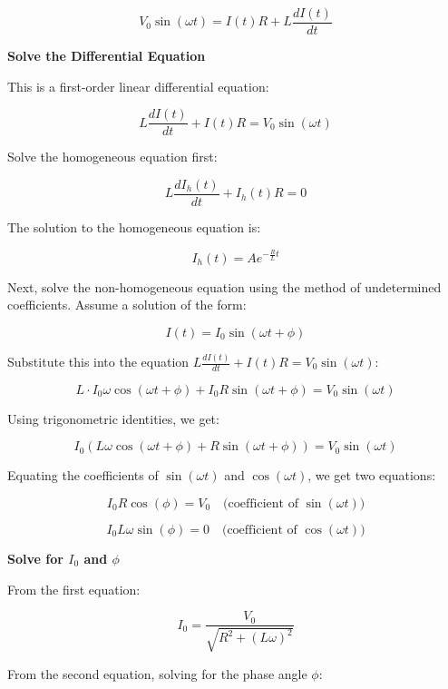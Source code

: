 \documentclass{beamer}
\begin{document}
\begin{frame}

\[
V_0 \sin(\omega t) = I(t) R + L \frac{dI(t)}{dt}
\]

\textbf{Solve the Differential Equation}

This is a first-order linear differential equation:

\[
L \frac{dI(t)}{dt} + I(t) R = V_0 \sin(\omega t)
\]

Solve the homogeneous equation first:

\[
L \frac{dI_h(t)}{dt} + I_h(t) R = 0
\]

The solution to the homogeneous equation is:

\[
I_h(t) = A e^{-\frac{R}{L} t}
\]

Next, solve the non-homogeneous equation using the method of undetermined coefficients. Assume a solution of the form:

\[
I(t) = I_0 \sin(\omega t + \phi)
\]

\end{frame}
\begin{frame}

Substitute this into the equation \( L \frac{dI(t)}{dt} + I(t) R = V_0 \sin(\omega t) \):

\[
L \cdot I_0 \omega \cos(\omega t + \phi) + I_0 R \sin(\omega t + \phi) = V_0 \sin(\omega t)
\]

Using trigonometric identities, we get:

\[
I_0 (L \omega \cos(\omega t + \phi) + R \sin(\omega t + \phi)) = V_0 \sin(\omega t)
\]

Equating the coefficients of \( \sin(\omega t) \) and \( \cos(\omega t) \), we get two equations:

\[
I_0 R \cos(\phi) = V_0 \quad \text{(coefficient of } \sin(\omega t))
\]

\[
I_0 L \omega \sin(\phi) = 0 \quad \text{(coefficient of } \cos(\omega t))
\]

\textbf{Solve for \( I_0 \) and \( \phi \)}

From the first equation:

\[
I_0 = \frac{V_0}{\sqrt{R^2 + (L \omega)^2}}
\]

From the second equation, solving for the phase angle \( \phi \):

\end{frame}
\end{document}
